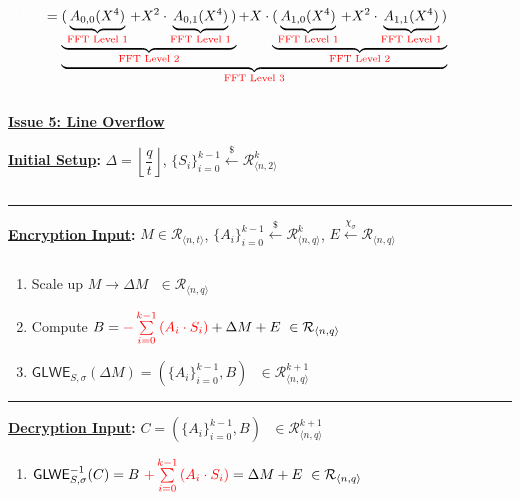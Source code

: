 $\mathcolor{white}{A(X)} = \underbrace{\underbrace{(\underbrace{A_{0,0}(X^4)}_{\text{\textcolor{red}{FFT Level 1}}} + X^2\cdot \underbrace{A_{0,1}(X^4)}_{\text{\textcolor{red}{FFT Level 1}}})}_{\text{\textcolor{red}{FFT Level 2}}} + X \cdot \underbrace{(\underbrace{A_{1,0}(X^4)}_{\text{\textcolor{red}{FFT Level 1}}} + X^2\cdot \underbrace{A_{1,1}(X^4)}_{\text{\textcolor{red}{FFT Level 1}}})}_{\text{\textcolor{red}{FFT Level 2}}}}_{\text{\textcolor{red}{FFT Level 3}}}$



$ $

\underline{\textbf{Issue 5: Line Overflow}}

\begin{tcolorbox}[title={\textbf{\tboxlabel{\ref*{subsec:glwe-alternative}} An Alternative GLWE Cryptosystem}}]

\textbf{\underline{Initial Setup}:} $\Delta = \left\lfloor\dfrac{q}{t}\right\rfloor$, $\{S_i\}_{i=0}^{k-1} \xleftarrow{\$} \mathcal{R}_{\langle n, 2 \rangle}^k$

$ $

\par\noindent\rule{\textwidth}{0.4pt}


\textbf{\underline{Encryption Input}:} $M \in \mathcal{R}_{\langle n, t \rangle}$, $\{A_i\}_{i=0}^{k-1} \xleftarrow{\$} \mathcal{R}_{\langle n,q \rangle}^{k}$, $E \xleftarrow{\chi_\sigma} \mathcal{R}_{\langle n,q \rangle}$

$ $

\begin{enumerate}
\item Scale up $M \longrightarrow \Delta M \text { } \in \mathcal{R}_{\langle n, q\rangle}$

\item Compute $B = \textcolor{red}{-\sum\limits_{i=0}^{k-1}{(A_i \cdot S_i)}} + \Delta  M + E \text{ } \in \mathcal{R}_{\langle n,q \rangle}$

\item $\textsf{GLWE}_{S,\sigma}(\Delta M) = (\{A_i\}_{i=0}^{k-1}, B) \text{ } \in \mathcal{R}_{\langle n,q \rangle}^{k + 1}$ 

\end{enumerate}

\par\noindent\rule{\textwidth}{0.4pt}


\textbf{\underline{Decryption Input}:} $C = (\{A_i\}_{i=0}^{k-1}, B) \text{ } \in \mathcal{R}_{\langle n,q \rangle}^{k + 1}$

\begin{enumerate}
\item $\textsf{GLWE}^{-1}_{S,\sigma}(C) = B \text{ } \textcolor{red}{ + \sum\limits_{i=0}^{k-1}{(A_i \cdot S_i)}} = \Delta  M + E \text{ } \in \mathcal{R}_{\langle n,q \rangle}$


\end{enumerate}
\end{tcolorbox}
